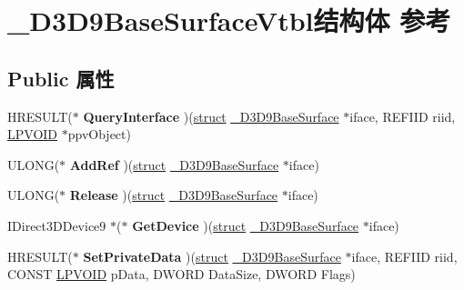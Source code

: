 \hypertarget{struct___d3_d9_base_surface_vtbl}{}\section{\+\_\+\+D3\+D9\+Base\+Surface\+Vtbl结构体 参考}
\label{struct___d3_d9_base_surface_vtbl}
\subsection*{Public 属性}
\begin{DoxyCompactItemize}
\item 
\mbox{\label{struct___d3_d9_base_surface_vtbl_a83f02f806558c203c9e17845426758d2}} 
H\+R\+E\+S\+U\+LT($\ast$ {\bfseries Query\+Interface} )(\hyperlink{interfacestruct}{struct} \hyperlink{struct___d3_d9_base_surface}{\+\_\+\+D3\+D9\+Base\+Surface} $\ast$iface, R\+E\+F\+I\+ID riid, \hyperlink{interfacevoid}{L\+P\+V\+O\+ID} $\ast$ppv\+Object)
\item 
\mbox{\label{struct___d3_d9_base_surface_vtbl_addc76d1f94340bf6af81f87d404c5f33}} 
U\+L\+O\+NG($\ast$ {\bfseries Add\+Ref} )(\hyperlink{interfacestruct}{struct} \hyperlink{struct___d3_d9_base_surface}{\+\_\+\+D3\+D9\+Base\+Surface} $\ast$iface)
\item 
\mbox{\label{struct___d3_d9_base_surface_vtbl_ae4902a16ad6d9e34aa7e8a4c1e8448d4}} 
U\+L\+O\+NG($\ast$ {\bfseries Release} )(\hyperlink{interfacestruct}{struct} \hyperlink{struct___d3_d9_base_surface}{\+\_\+\+D3\+D9\+Base\+Surface} $\ast$iface)
\item 
\mbox{\label{struct___d3_d9_base_surface_vtbl_a70638c77ba72ea6df84260eeb1c54751}} 
I\+Direct3\+D\+Device9 $\ast$($\ast$ {\bfseries Get\+Device} )(\hyperlink{interfacestruct}{struct} \hyperlink{struct___d3_d9_base_surface}{\+\_\+\+D3\+D9\+Base\+Surface} $\ast$iface)
\item 
\mbox{\label{struct___d3_d9_base_surface_vtbl_a626b2c9302ff8f2f7dd9214fc433740d}} 
H\+R\+E\+S\+U\+LT($\ast$ {\bfseries Set\+Private\+Data} )(\hyperlink{interfacestruct}{struct} \hyperlink{struct___d3_d9_base_surface}{\+\_\+\+D3\+D9\+Base\+Surface} $\ast$iface, R\+E\+F\+I\+ID riid, C\+O\+N\+ST \hyperlink{interfacevoid}{L\+P\+V\+O\+ID} p\+Data, D\+W\+O\+RD Data\+Size, D\+W\+O\+RD Flags)

\end{DoxyCompactItemize}
